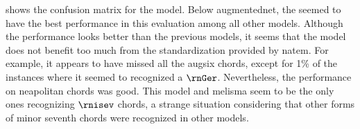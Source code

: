 
 shows the confusion
matrix for the \textcite{mcleod2021modular} model. Below
\gls{augmentednet}, the \textcite{mcleod2021modular} seemed
to have the best performance in this evaluation among all
other models. Although the performance looks better than the
previous models, it seems that the model does not benefit
too much from the standardization provided by \gls{natem}.
For example, it appears to have missed all the \gls{augsix}
chords, except for 1\% of the instances where it seemed to
recognized a $\rnGer$. Nevertheless, the performance on
\gls{neapolitan} chords was good. This model and
\gls{melisma} seem to be the only ones recognizing $\rnisev$
chords, a strange situation considering that other forms of
minor seventh chords were recognized in other models.

